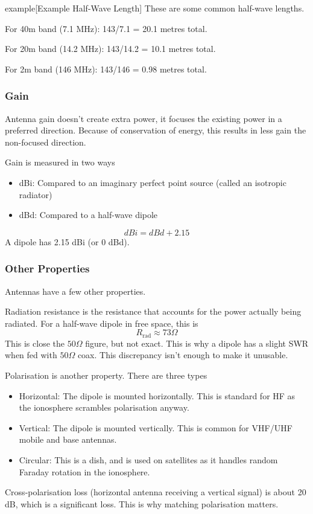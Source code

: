 \documentclass{article}
\begin{document}
\begin{callout}{example}[Example Half-Wave Length]
    These are some common half-wave lengths.

    For 40m band (7.1 MHz): 143/7.1 = 20.1 metres total.

    For 20m band (14.2 MHz): 143/14.2 = 10.1 metres total.

    For 2m band (146 MHz): 143/146 = 0.98 metres total.
\end{callout}

\subsubsection{Gain}
Antenna gain doesn't create extra power, it focuses the existing power in a preferred direction. Because of conservation of energy, this results in less gain the non-focused direction.

Gain is measured in two ways
\begin{itemize}
    \item dBi: Compared to an imaginary perfect point source (called an isotropic radiator)
    \item dBd: Compared to a half-wave dipole
\end{itemize}
\[
    dBi = dBd+2.15
\]
A dipole has 2.15 dBi (or 0 dBd).

\subsubsection{Other Properties}
Antennas have a few other properties.

Radiation resistance is the resistance that accounts for the power actually being radiated. For a half-wave dipole in free space, this is
\[
    R_{\text{rad}}\approx 73\Omega 
\]
This is close the $50\Omega $ figure, but not exact. This is why a dipole has a slight SWR when fed with $50\Omega $ coax. This discrepancy isn't enough to make it unusable.

Polarisation is another property. There are three types
\begin{itemize}
    \item Horizontal: The dipole is mounted horizontally. This is standard for HF as the ionosphere scrambles polarisation anyway.
    \item Vertical: The dipole is mounted vertically. This is common for VHF/UHF mobile and base antennas.
    \item Circular: This is a dish, and is used on satellites as it handles random Faraday rotation in the ionosphere.
\end{itemize}
Cross-polarisation loss (horizontal antenna receiving a vertical signal) is about 20 dB, which is a significant loss. This is why matching polarisation matters.
\end{document}
